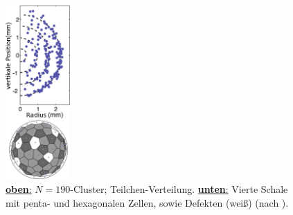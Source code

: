 \documentclass[numbers=noenddot,a4paper]{scrartcl}
\newcommand{\fett}[1]{\textbf{#1}}
\begin{document}
						\begin{figure}
							\centering
							\vspace{-0.5cm}
							\includegraphics[width=0.22\textwidth,height=0.55\textwidth]{figs/yukawaballN190.png}
							\caption{\underline{\fett{oben}:} $N=190$-Cluster; Teilchen-Verteilung. \underline{\fett{unten}:} Vierte Schale mit penta- und hexagonalen Zellen, sowie Defekten (weiß) (nach \cite{Arp04}).}\label{img:strukturN190}
						\end{figure}
\end{document}
